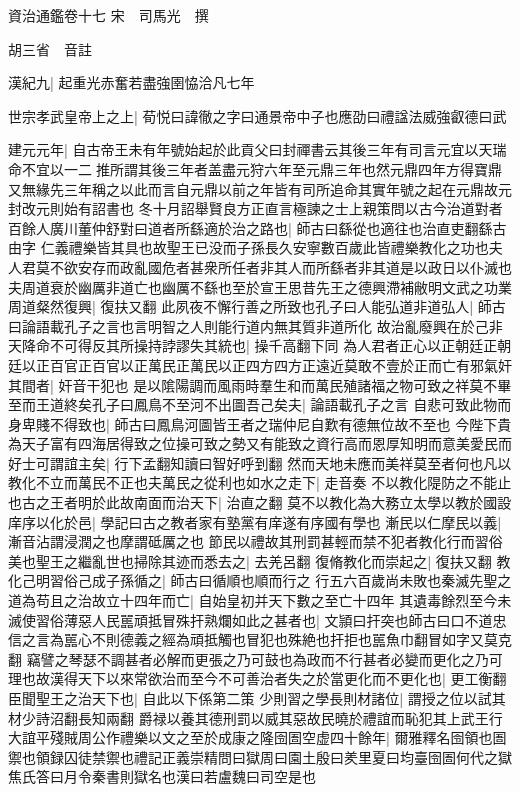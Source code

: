 資治通鑑卷十七
宋　司馬光　撰

胡三省　音註

漢紀九|{
	起重光赤奮若盡強圉恊洽凡七年}


世宗孝武皇帝上之上|{
	荀悦曰諱徹之字曰通景帝中子也應劭曰禮諡法威強叡德曰武}


建元元年|{
	自古帝王未有年號始起於此貢父曰封禪書云其後三年有司言元宜以天瑞命不宜以一二推所謂其後三年者盖盡元狩六年至元鼎三年也然元鼎四年方得寶鼎又無緣先三年稱之以此而言自元鼎以前之年皆有司所追命其實年號之起在元鼎故元封改元則始有詔書也}
冬十月詔舉賢良方正直言極諫之士上親策問以古今治道對者百餘人廣川董仲舒對曰道者所繇適於治之路也|{
	師古曰繇從也適往也治直吏翻繇古由字}
仁義禮樂皆其具也故聖王已没而子孫長久安寧數百歲此皆禮樂教化之功也夫人君莫不欲安存而政亂國危者甚衆所任者非其人而所繇者非其道是以政日以仆滅也夫周道衰於幽厲非道亡也幽厲不繇也至於宣王思昔先王之德興滯補敝明文武之功業周道粲然復興|{
	復扶又翻}
此夙夜不懈行善之所致也孔子曰人能弘道非道弘人|{
	師古曰論語載孔子之言也言明智之人則能行道内無其質非道所化}
故治亂廢興在於己非天降命不可得反其所操持誖謬失其統也|{
	操千高翻下同}
為人君者正心以正朝廷正朝廷以正百官正百官以正萬民正萬民以正四方四方正遠近莫敢不壹於正而亡有邪氣奸其間者|{
	奸音干犯也}
是以隂陽調而風雨時羣生和而萬民殖諸福之物可致之祥莫不畢至而王道終矣孔子曰鳳鳥不至河不出圖吾己矣夫|{
	論語載孔子之言}
自悲可致此物而身卑賤不得致也|{
	師古曰鳳鳥河圖皆王者之瑞仲尼自歎有德無位故不至也}
今陛下貴為天子富有四海居得致之位操可致之勢又有能致之資行高而恩厚知明而意美愛民而好士可謂誼主矣|{
	行下孟翻知讀曰智好呼到翻}
然而天地未應而美祥莫至者何也凡以教化不立而萬民不正也夫萬民之從利也如水之走下|{
	走音奏}
不以教化隄防之不能止也古之王者明於此故南面而治天下|{
	治直之翻}
莫不以教化為大務立太學以教於國設庠序以化於邑|{
	學記曰古之教者家有塾黨有庠遂有序國有學也}
漸民以仁摩民以義|{
	漸音沾謂浸潤之也摩謂砥厲之也}
節民以禮故其刑罰甚輕而禁不犯者教化行而習俗美也聖王之繼亂世也掃除其迹而悉去之|{
	去羌呂翻}
復脩教化而崇起之|{
	復扶又翻}
教化己明習俗己成子孫循之|{
	師古曰循順也順而行之}
行五六百歲尚未敗也秦滅先聖之道為苟且之治故立十四年而亡|{
	自始皇初并天下數之至亡十四年}
其遺毒餘烈至今未滅使習俗薄惡人民嚚頑抵冒殊扞熟爛如此之甚者也|{
	文頴曰扞突也師古曰口不道忠信之言為嚚心不則德義之經為頑抵觸也冒犯也殊絶也扞拒也嚚魚巾翻冒如字又莫克翻}
竊譬之琴瑟不調甚者必解而更張之乃可鼓也為政而不行甚者必變而更化之乃可理也故漢得天下以來常欲治而至今不可善治者失之於當更化而不更化也|{
	更工衡翻}
臣聞聖王之治天下也|{
	自此以下係第二策}
少則習之學長則材諸位|{
	謂授之位以試其材少詩沼翻長知兩翻}
爵禄以養其德刑罰以威其惡故民曉於禮誼而恥犯其上武王行大誼平殘賊周公作禮樂以文之至於成康之隆囹圄空虚四十餘年|{
	爾雅釋名囹領也圄禦也領録囚徒禁禦也禮記正義崇精問曰獄周曰園土殷曰羑里夏曰均臺囹圄何代之獄焦氏答曰月令秦書則獄名也漢曰若盧魏曰司空是也}
